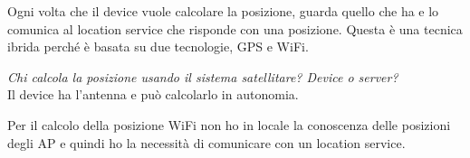 Ogni volta che il device vuole calcolare la posizione, guarda quello che ha e lo comunica al location service che risponde con una posizione. 
Questa è una tecnica ibrida perché è basata su due tecnologie, GPS e WiFi.

\textit{Chi calcola la posizione usando il sistema satellitare? Device o server?}
\\ Il device ha l'antenna e può calcolarlo in autonomia. 

Per il calcolo della posizione WiFi non ho in locale la conoscenza delle posizioni degli AP e quindi ho la necessità di comunicare con un location service. 

